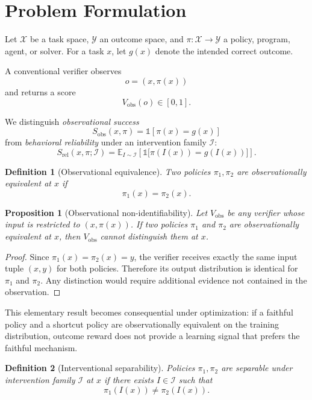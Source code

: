 \documentclass[10pt]{article}
\newtheorem{proposition}{Proposition}
\newtheorem{definition}{Definition}
\newcommand{\E}{\mathbb{E}}
\begin{document}
\section{Problem Formulation}

Let $\mathcal{X}$ be a task space, $\mathcal{Y}$ an outcome space, and $\pi:\mathcal{X}\to\mathcal{Y}$ a policy, program, agent, or solver. For a task $x$, let $g(x)$ denote the intended correct outcome.

A conventional verifier observes
\[
o=(x,\pi(x))
\]
and returns a score
\[
V_{\mathrm{obs}}(o)\in[0,1].
\]

We distinguish \emph{observational success}
\[
S_{\mathrm{obs}}(x,\pi)=\mathbb{1}[\pi(x)=g(x)]
\]
from \emph{behavioral reliability} under an intervention family $\mathcal{I}$:
\[
S_{\mathrm{rel}}(x,\pi;\mathcal{I})
=
\E_{I\sim \mathcal{I}}
\left[
\mathbb{1}\big[\pi(I(x))=g(I(x))\big]
\right].
\]

\begin{definition}[Observational equivalence]
Two policies $\pi_1,\pi_2$ are observationally equivalent at $x$ if
\[
\pi_1(x)=\pi_2(x).
\]
\end{definition}

\begin{proposition}[Observational non-identifiability]
Let $V_{\mathrm{obs}}$ be any verifier whose input is restricted to $(x,\pi(x))$. If two policies $\pi_1$ and $\pi_2$ are observationally equivalent at $x$, then $V_{\mathrm{obs}}$ cannot distinguish them at $x$.
\end{proposition}

\begin{proof}
Since $\pi_1(x)=\pi_2(x)=y$, the verifier receives exactly the same input tuple $(x,y)$ for both policies. Therefore its output distribution is identical for $\pi_1$ and $\pi_2$. Any distinction would require additional evidence not contained in the observation.
\end{proof}

This elementary result becomes consequential under optimization: if a faithful policy and a shortcut policy are observationally equivalent on the training distribution, outcome reward does not provide a learning signal that prefers the faithful mechanism.

\begin{definition}[Interventional separability]
Policies $\pi_1,\pi_2$ are separable under intervention family $\mathcal{I}$ at $x$ if there exists $I\in\mathcal{I}$ such that
\[
\pi_1(I(x))\neq\pi_2(I(x)).
\]
\end{definition}
\end{document}

